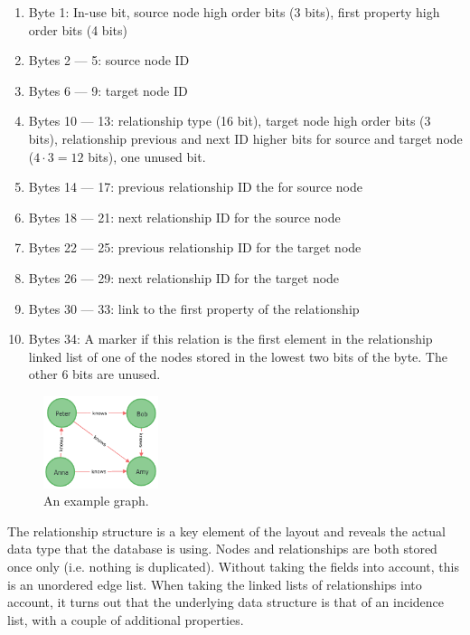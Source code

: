            \begin{enumerate}
                \item Byte 1: In-use bit, source node high order bits (3 bits), first property high order bits (4 bits)
                \item Bytes 2 --- 5: source node ID 
                \item Bytes 6 --- 9: target node ID 
                \item Bytes 10 --- 13: relationship type (16 bit), target node high order bits (3 bits), relationship previous and next ID higher bits for source and target node ($4 \cdot 3 = 12$ bits), one unused bit.
                \item Bytes 14 --- 17: previous relationship ID the for source node
                \item Bytes 18 --- 21: next relationship ID for the source node
                \item Bytes 22 --- 25: previous relationship ID for the target node
                \item Bytes 26 --- 29: next relationship ID for the target node
                \item Bytes 30 --- 33: link to the first property of the relationship
                \item Bytes 34: A marker if this relation is the first element in the relationship linked list of one of the nodes stored in the lowest two bits of the byte. 
                The other 6 bits are unused.
            \end{enumerate}
            
            \begin{figure}[htp]
                \begin{center}
                    \includegraphics[keepaspectratio,height=0.4\textheight,width=0.3\textwidth]{img/04-databases/graph.png}
                \end{center}
                \caption{An example graph.}
                \label{n4j-ex-gr}
            \end{figure}
            
            The relationship structure is a key element of the layout and reveals the actual data type that the database is using.
            Nodes and relationships are both stored once only (i.e. nothing is duplicated).
            Without taking the fields into account, this is an unordered edge list.
            When taking the linked lists of relationships into account, it turns out that the underlying data structure is that of an incidence list, with a couple of additional properties.
            
